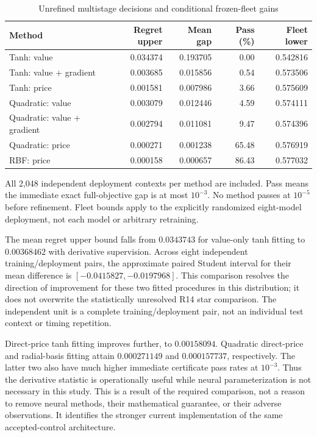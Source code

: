 \documentclass[11pt,letterpaper]{article}
\theoremstyle{definition}
\newcommand{\1}{\mathbf 1}
\begin{document}
\begin{table}[p]
\centering
\caption{Unrefined multistage decisions and conditional frozen-fleet gains}\label{tab:r19-quality}
\setlength{\tabcolsep}{4pt}
\begin{tabular}{lrrrr}
\toprule
Method & Regret upper & Mean gap & Pass (\%) & Fleet lower \\
\midrule
Tanh: value & 0.034374 & 0.193705 & 0.00 & 0.542816 \\
Tanh: value + gradient & 0.003685 & 0.015856 & 0.54 & 0.573506 \\
Tanh: price & 0.001581 & 0.007986 & 3.66 & 0.575609 \\
Quadratic: value & 0.003079 & 0.012446 & 4.59 & 0.574111 \\
Quadratic: value + gradient & 0.002794 & 0.011081 & 9.47 & 0.574396 \\
Quadratic: price & 0.000271 & 0.001238 & 65.48 & 0.576919 \\
RBF: price & 0.000158 & 0.000657 & 86.43 & 0.577032 \\
\bottomrule
\end{tabular}

\par\medskip\begin{minipage}{\textwidth}All 2,048 independent deployment contexts per method are included. Pass means the immediate exact full-objective gap is at most $10^{-3}$. No method passes at $10^{-5}$ before refinement. Fleet bounds apply to the explicitly randomized eight-model deployment, not each model or arbitrary retraining.\end{minipage}
\end{table}

The mean regret upper bound falls from $0.0343743$ for value-only tanh fitting to $0.00368462$ with derivative supervision. Across eight independent training/deployment pairs, the approximate paired Student interval for their mean difference is $[-0.0415827,-0.0197968]$. This comparison resolves the direction of improvement for these two fitted procedures in this distribution; it does not overwrite the statistically unresolved R14 star comparison. The independent unit is a complete training/deployment pair, not an individual test context or timing repetition.

Direct-price tanh fitting improves further, to $0.00158094$. Quadratic direct-price and radial-basis fitting attain $0.000271149$ and $0.000157737$, respectively. The latter two also have much higher immediate certificate pass rates at $10^{-3}$. Thus the derivative statistic is operationally useful while neural parameterization is not necessary in this study. This is a result of the required comparison, not a reason to remove neural methods, their mathematical guarantee, or their adverse observations. It identifies the stronger current implementation of the same accepted-control architecture.
\end{document}
